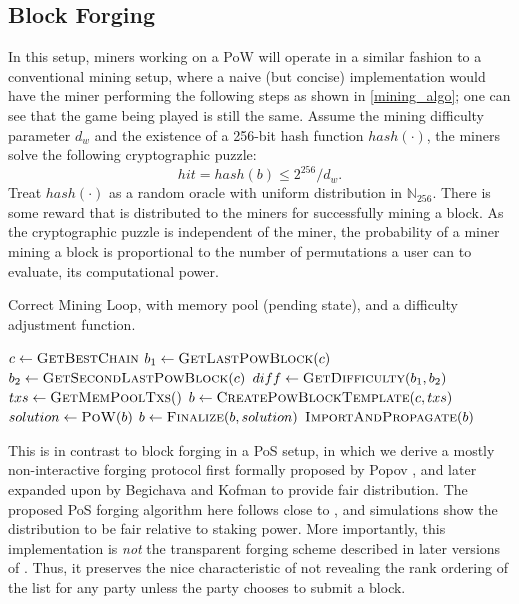 \documentclass[a4paper]{article}
\begin{document}
\subsection{Block Forging}

In this setup, miners working on a PoW will operate in a similar fashion to a conventional mining setup, where a naive (but concise) implementation would have the miner performing the following steps as shown in \cref{mining_algo}; one can see that the game being played is still the same. Assume the mining difficulty parameter $d_w$ and the existence of a 256-bit hash function $hash(\cdot)$, the miners solve the following cryptographic puzzle:
\begin{equation}
hit = hash(b) \leq 2^{256} / d_w.
\end{equation}
Treat $hash(\cdot)$ as a random oracle with uniform distribution in $\mathbb{N}_{256}$. There is some reward that is distributed to the miners for successfully mining a block. As the cryptographic puzzle is independent of the miner, the probability of a miner mining a block is proportional to the number of permutations a user can to evaluate, its computational power.

\begin{algorithm}
    \caption{Correct Mining Loop, with memory pool (pending state), and a difficulty adjustment function.}
    \label{mining_algo}
    \begin{algorithmic}[1]
        \State $c    \gets \Call{GetBestChain}{}$
        \State $b_1  \gets \Call{GetLastPowBlock}{c}$
        \State $b_2  \gets \Call{GetSecondLastPowBlock}{c}$
        \State $diff \gets \Call{GetDifficulty}{b_1, b_2}$
        \State $txs  \gets \Call{GetMemPoolTxs}$
        \State $b    \gets \Call{CreatePowBlockTemplate}{c, txs}$
        \Do
            \State $solution \gets \Call{PoW}{b}$
        \State $b    \gets \Call{Finalize}{b, solution}$
        \State $\Call{ImportAndPropagate}{b}$
        \EndProcedure
  \end{algorithmic}
\end{algorithm}

This is in contrast to block forging in a PoS setup, in which we derive a mostly non-interactive forging protocol first formally proposed by Popov \cite{popov2016probabilistic}, and later expanded upon by Begichava and Kofman \cite{begichava2018} to provide fair distribution. The proposed PoS forging algorithm here follows close to \cite{begichava2018}, and simulations show the distribution to be fair relative to staking power. More importantly, this implementation is \textit{not} the transparent forging scheme described in later versions of \cite{popov2016probabilistic}. Thus, it preserves the nice characteristic of not revealing the rank ordering of the list for any party unless the party chooses to submit a block.
\end{document}
